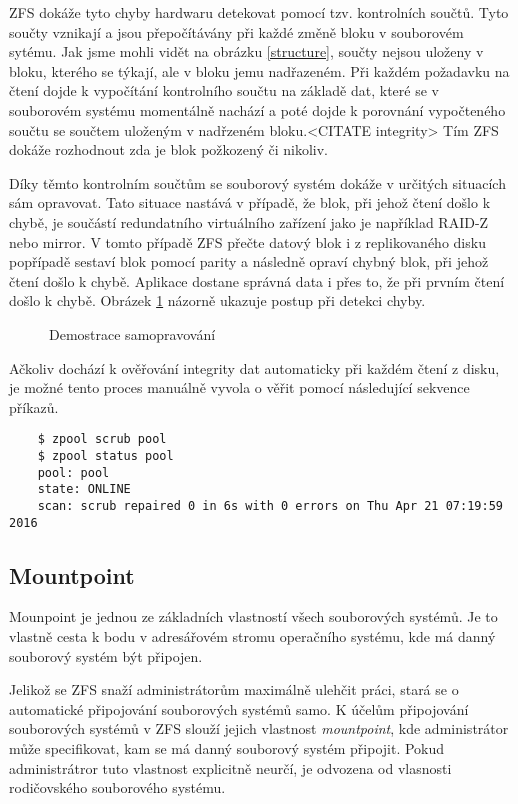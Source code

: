     ZFS dokáže tyto chyby hardwaru detekovat pomocí tzv. kontrolních součtů. Tyto součty vznikají a jsou přepočítávány při každé změně bloku v souborovém sytému. Jak jsme mohli vidět na obrázku \ref{structure}, součty nejsou uloženy v bloku, kterého se týkají, ale v bloku jemu nadřazeném. Při každém požadavku na čtení dojde k vypočítání kontrolního součtu na základě dat, které se v souborovém systému momentálně nachází a poté dojde k porovnání vypočteného součtu se součtem uloženým v nadřzeném bloku.<CITATE integrity> Tím ZFS dokáže rozhodnout zda je blok požkozený či nikoliv.
    
    Díky těmto kontrolním součtům se souborový systém dokáže v určitých situacích sám opravovat. Tato situace nastává v případě, že blok, při jehož čtení došlo k chybě, je součástí redundatního virtuálního zařízení jako je například RAID-Z nebo mirror. V tomto případě ZFS přečte datový blok i z replikovaného disku popřípadě sestaví blok pomocí parity a následně opraví chybný blok, při jehož čtení došlo k chybě. Aplikace dostane správná data i přes to, že při prvním čtení došlo k chybě. Obrázek \ref{selfhealing} názorně ukazuje postup při detekci chyby.
    \begin{figure}[h]
        \caption{Demostrace samopravování}
        \label{selfhealing}        
    \end{figure}   
    
    Ačkoliv dochází k ověřování integrity dat automaticky při každém čtení z disku, je možné tento proces manuálně vyvola o věřit pomocí následující sekvence příkazů.
    \begin{verbatim}
    $ zpool scrub pool
    $ zpool status pool
    pool: pool
    state: ONLINE
    scan: scrub repaired 0 in 6s with 0 errors on Thu Apr 21 07:19:59 2016
    \end{verbatim}

    \subsection{Mountpoint}
    \label{mountpoint}
    Mounpoint je jednou ze základních vlastností všech souborových systémů. Je to vlastně cesta k bodu v adresářovém stromu operačního systému, kde má danný souborový systém být připojen.
    
    Jelikož se ZFS snaží administrátorům maximálně ulehčit práci, stará se o automatické připojování souborových systémů samo. K účelům připojování souborových systémů v ZFS slouží jejich vlastnost \emph{mountpoint}, kde administrátor může specifikovat, kam se má danný souborový systém připojit. Pokud administrátror tuto vlastnost explicitně neurčí, je odvozena od vlasnosti rodičovského souborového systému. 
    
